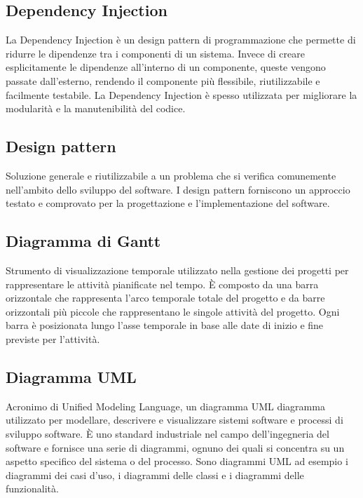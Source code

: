 \hypertarget{sec:dependency_injection}{}
\subsection*{Dependency Injection}
La Dependency Injection è un design pattern di programmazione che permette di ridurre le dipendenze tra i componenti di un sistema. Invece di creare
esplicitamente le dipendenze all'interno di un componente, queste vengono passate dall'esterno, rendendo il componente più flessibile, riutilizzabile e
facilmente testabile. La Dependency Injection è spesso utilizzata per migliorare la modularità e la manutenibilità del codice.

\hypertarget{sec:design_pattern}{}
\subsection*{Design pattern}
Soluzione generale e riutilizzabile a un problema che si verifica comunemente nell’ambito dello sviluppo del software.
I design pattern forniscono un approccio testato e comprovato per la progettazione e l’implementazione del software.

\hypertarget{sec:diagramma_Gantt}{}
\subsection*{Diagramma di Gantt}
Strumento di visualizzazione temporale utilizzato nella gestione dei progetti per rappresentare le attività pianificate nel tempo. È composto da una barra 
orizzontale che rappresenta l’arco temporale totale del progetto e da barre orizzontali più piccole che rappresentano le singole attività del progetto. 
Ogni barra è posizionata lungo l’asse temporale in base alle date di inizio e fine previste per l’attività.

\hypertarget{sec:diagramma_UML}{}
\subsection*{Diagramma UML}
Acronimo di Unified Modeling Language, un diagramma UML diagramma utilizzato per modellare, descrivere e visualizzare sistemi software e processi di sviluppo 
software. È uno standard industriale nel campo dell’ingegneria del software e fornisce una serie di diagrammi, ognuno dei quali si concentra su un aspetto 
specifico del sistema o del processo. Sono diagrammi UML ad esempio i diagrammi dei casi d’uso, i diagrammi delle classi e i diagrammi delle funzionalità.

